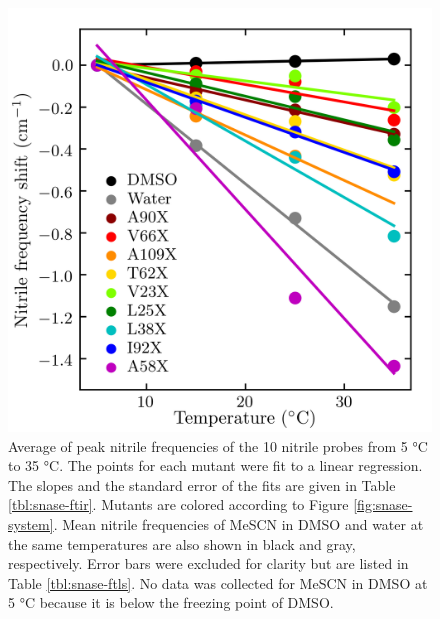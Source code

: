 \begin{figure}
    \center
    \includegraphics[width=\single]{figures-snase/ftls.png}
    \caption[]{
        Average of peak nitrile frequencies of the 10 nitrile probes from 5 \si{\celsius} to 35 \si{\celsius}. 
        The points for each mutant were fit to a linear regression. 
        The slopes and the standard error of the fits are given in Table \ref{tbl:snase-ftir}.  
        Mutants are colored according to Figure \ref{fig:snase-system}. 
        Mean nitrile frequencies of MeSCN in DMSO and water at the same temperatures are also shown in black and gray, respectively. 
        Error bars were excluded for clarity but are listed in Table \ref{tbl:snase-ftls}. 
        No data was collected for MeSCN in DMSO at 5 \si{\celsius} because it is below the freezing point of DMSO.
    }
    \label{fig:snase-ftls}
\end{figure}

